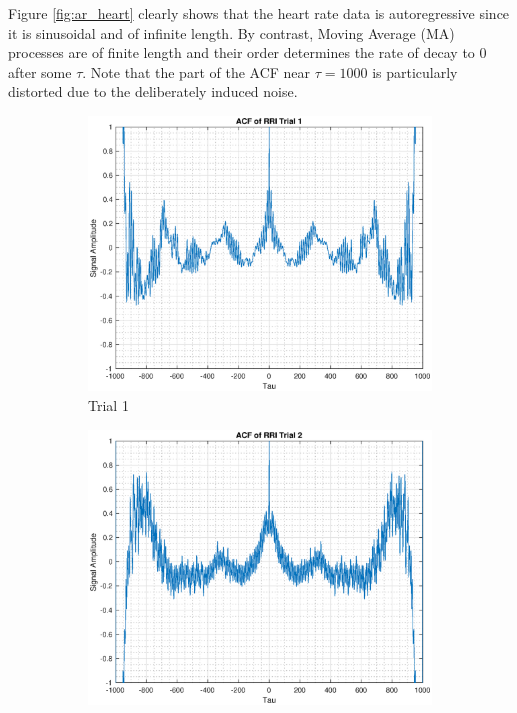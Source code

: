 Figure \ref{fig:ar_heart} clearly shows that the heart rate data is autoregressive since it is sinusoidal and of infinite length. By contrast, Moving Average (MA) processes are of finite length and their order determines the rate of decay to 0 after some $\tau$. Note that the part of the ACF near $\tau=1000$ is particularly distorted due to the deliberately induced noise.

\begin{figure}[h!]
\centering
\begin{subfigure}{0.32\textwidth}
\centering
\includegraphics[width = \textwidth]{heart_acf_t1}
\caption{Trial 1}
\label{fig:heart_acf_t1}
\end{subfigure}
\begin{subfigure}{0.32\textwidth}
\centering
\includegraphics[width = \textwidth]{heart_acf_t2}

\end{subfigure}
\end{figure}
